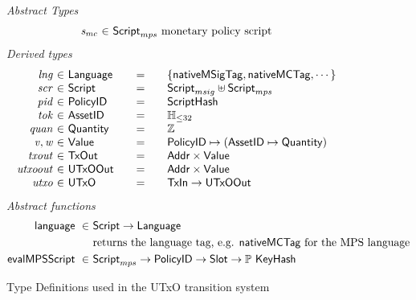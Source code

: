 \begin{figure*}[t!]
  \emph{Abstract Types}
  \begin{equation*}
    \begin{array}{r@{~\in~}l@{~}lr}
      \var{s_{mc}} & \ScriptMPS & \text{monetary policy script}
     \end{array}
  \end{equation*}
  \emph{Derived types}
  \begin{equation*}
    \begin{array}{r@{~\in~}l@{\qquad=\qquad}lr}
      \var{lng} & \Language & \{\mathsf{nativeMSigTag}, \mathsf{nativeMCTag}, \cdots\} \\
      \var{scr} & \Script & \ScriptMSig \uniondistinct \ScriptMPS \\
      \var{pid} & \PolicyID & \ScriptHash \\
      \var{tok} & \AssetID & \mathbb{H}_{\leq 32}\\
      \var{quan} & \Quantity & \Z \\
      \var{v}, \var{w} & \Value
      & \PolicyID \mapsto ( \AssetID \mapsto \Quantity ) \\
      \var{txout}
      & \TxOut
      & \Addr \times \Value
      \\
      \var{utxoout}
      & \UTxOOut
      & \Addr \times \Value \\
      \var{utxo}
      & \UTxO
      & \TxIn \to \UTxOOut
    \end{array}
  \end{equation*}
  \emph{Abstract functions}
  \begin{align*}
    \mathsf{language} ~\in~    & \mathsf{Script} \to \mathsf{Language} \\
                            & \text{returns the language tag, e.g. $\mathsf{nativeMCTag}$ for the MPS language} \\
    \mathsf{evalMPSScript}~\in~& \mathsf{Script}_{mps}\to\mathsf{PolicyID}\to\mathsf{Slot}\to\mathbb{P}~\mathsf{KeyHash} \\
  \end{align*}

  \caption{Type Definitions used in the UTxO transition system}
  \label{fig:defs:utxo-shelley-1}
\end{figure*}

